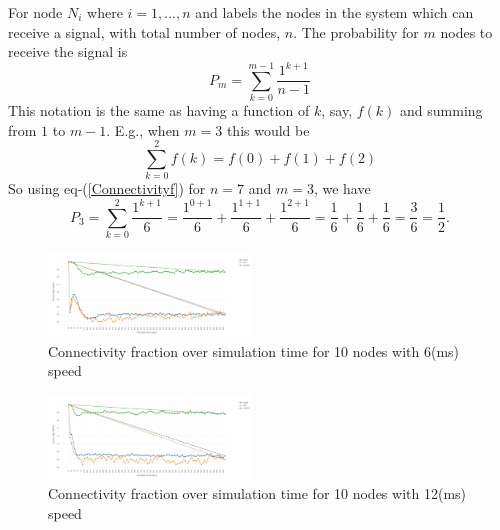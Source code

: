 \documentclass[letterpaper, 10 pt, conference]{ieeeconf}  %
\begin{document}



For node $N_i$ where $i=1,..., n$ and labels the nodes in the system which can receive a signal, with total number of nodes, $n$. The probability for $m$ nodes to receive the signal is
\begin{equation}\label{Connectivityf}
P_m=\sum_{k=0}^{m-1}\frac{1^{k+1}}{n-1}
\end{equation}
This notation is the same as having a function of $k$, say, $f(k)$ and summing from $1$ to $m-1$. E.g., when $m=3$ this would be
$$\sum_{k=0}^{2}f(k)=f(0)+f(1)+f(2)$$
So using eq-(\ref{Connectivityf}) for $n=7$ and $m=3$, we have
\begin{equation}
\label{connectivity_f}
P_3=\sum_{k=0}^{2}\frac{1^{k+1}}{6}=\frac{1^{0+1}}{6}+\frac{1^{1+1}}{6}+\frac{1^{2+1}}{6}=\frac{1}{6}+\frac{1}{6}+\frac{1}{6}=\frac{3}{6}=\frac{1}{2}.
\end{equation}






\begin{figure}[H]
\includegraphics[width=0.48\textwidth]{10Nodes06speed}
\caption{Connectivity fraction over simulation time for 10 nodes with 6(ms) speed}
\label{fig:10Nodes06speed}
\end{figure}






\begin{figure}[H]
\includegraphics[width=0.48\textwidth]{10Nodes12speed}
\caption{Connectivity fraction over simulation time for 10 nodes with 12(ms) speed}
\label{fig:10Nodes12speed}
\end{figure}
\end{document}

